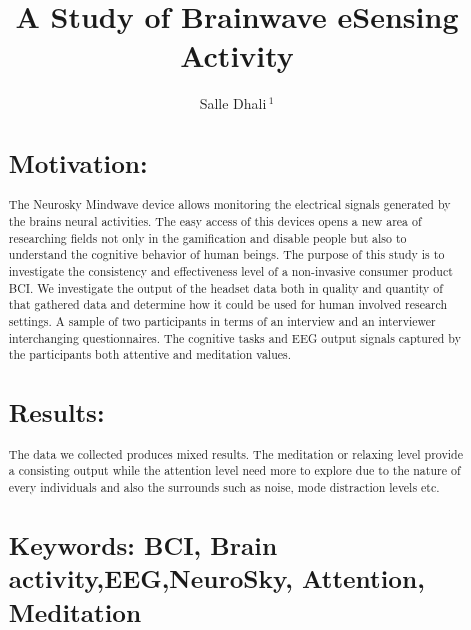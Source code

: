\documentclass{bioinfo}
\begin{document}

\title[BCI]{A Study of Brainwave eSensing Activity }
\author[Dhali \textit{et~al}]{Salle Dhali\,$^{1}$}
\address{$^{1}$Department of Computer Science, Malm\"{o} University.\\}



\maketitle

\begin{abstract}

\section{Motivation:}
The  Neurosky Mindwave device allows monitoring the electrical signals generated by the brains neural activities. The easy access of this devices opens a new area of researching fields not only in the gamification and disable people but also to understand the cognitive behavior of human beings. The purpose of this study is to investigate the consistency and effectiveness level of a non-invasive consumer product BCI. We investigate the output of the headset data both in quality and quantity of that gathered data and determine how it could be used for human involved research settings. A sample of two participants in terms of an interview and an interviewer interchanging questionnaires. The cognitive tasks and EEG output signals captured by the participants both attentive and meditation values.

\section{Results:}
The data we collected produces mixed results. The meditation or relaxing level provide a consisting output while the attention level need more to explore due to the nature of every individuals and also the surrounds such as noise, mode distraction levels etc.


\section{Keywords: BCI, Brain activity,EEG,NeuroSky, Attention, Meditation} \end{abstract}
\end{document}

